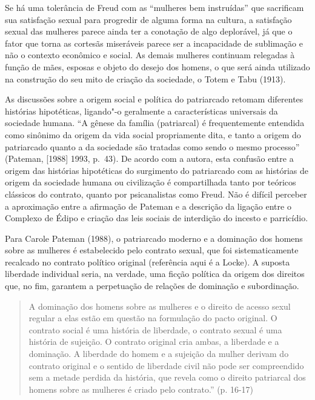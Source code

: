 Se há uma tolerância de Freud com as ``mulheres bem instruídas'' que
sacrificam sua satisfação sexual para progredir de alguma forma na
cultura, a satisfação sexual das mulheres parece ainda ter a conotação
de algo deplorável, já que o fator que torna as cortesãs miseráveis
parece ser a incapacidade de sublimação e não o contexto econômico e
social. As demais mulheres continuam relegadas à função de mães, esposas
e objeto do desejo dos homens, o que será ainda utilizado na construção
do seu mito de criação da sociedade, o Totem e Tabu (1913).

As discussões sobre a origem social e política do patriarcado retomam
diferentes histórias hipotéticas, ligando"-o geralmente a características
universais da sociedade humana. ``A gênese da família (patriarcal) é
frequentemente entendida como sinônimo da origem da vida social
propriamente dita, e tanto a origem do patriarcado quanto a da sociedade
são tratadas como sendo o mesmo processo'' (Pateman, {[}1988{]} 1993,
p.~43). De acordo com a autora, esta confusão entre a origem das
histórias hipotéticas do surgimento do patriarcado com as histórias de
origem da sociedade humana ou civilização é compartilhada tanto por
teóricos clássicos do contrato, quanto por psicanalistas como Freud. Não
é difícil perceber a aproximação entre a afirmação de Pateman e a
descrição da ligação entre o Complexo de Édipo e criação das leis
sociais de interdição do incesto e parricídio.

Para Carole Pateman (1988), o patriarcado moderno e a dominação dos
homens sobre as mulheres é estabelecido pelo contrato sexual, que foi
sistematicamente recalcado no contrato político original (referência
aqui é a Locke). A suposta liberdade individual seria, na verdade, uma
ficção política da origem dos direitos que, no fim, garantem a
perpetuação de relações de dominação e subordinação.

\begin{quote}
A dominação dos homens sobre as mulheres e o direito de acesso sexul
regular a elas estão em questão na formulação do pacto original. O
contrato social é uma história de liberdade, o contrato sexual é uma
história de sujeição. O contrato original cria ambas, a liberdade e a
dominação. A liberdade do homem e a sujeição da mulher derivam do
contrato original e o sentido de liberdade civil não pode ser
compreendido sem a metade perdida da história, que revela como o direito
patriarcal dos homens sobre as mulheres é criado pelo contrato.'' (p.
16-17)
\end{quote}

